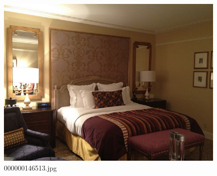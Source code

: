 \begin{figure}[h]
    \centering
    \includegraphics[width=0.8\linewidth]{../image set/hard/000000146513.jpg}
    \caption{000000146513.jpg}
\end{figure}
